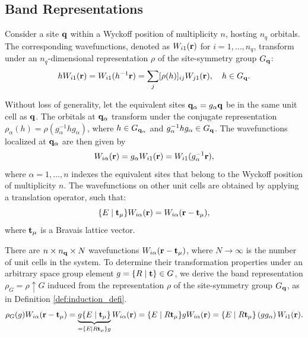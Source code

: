 \documentclass[12pt]{report}
\begin{document}
\subsection{Band Representations} \label{subsec:band_reps}

Consider a site \({\vb{q}}\) within a Wyckoff position of multiplicity \(n\), hosting \(n_q\) orbitals. The corresponding wavefunctions, denoted as \(W_{i1}({\vb{r}})\) for \(i = 1, \ldots, n_q\), transform under an \(n_q\)-dimensional representation \(\rho\) of the site-symmetry group \(G_{\vb{q}}\):
\begin{equation} \label{eq:gWi1_nq_rep}
h W_{i1}({\vb{r}}) = W_{i1}(h^{-1} {\vb{r}}) = \sum_{j} [\rho(h)]_{ij} W_{j1}({\vb{r}}), \quad h \in G_{\vb{q}}.
\end{equation}

Without loss of generality, let the equivalent sites \({\vb{q}}_\alpha = g_{\alpha} {\vb{q}}\) be in the same unit cell as \({\vb{q}}\). The orbitals at \({\vb{q}}_\alpha\) transform under the conjugate representation \(\rho_\alpha(h) = \rho(g_\alpha^{-1} h g_\alpha)\), where \(h \in G_{{\vb{q}}_\alpha}\) and \(g_\alpha^{-1} h g_\alpha \in G_{\vb{q}}\). The wavefunctions localized at \({\vb{q}}_\alpha\) are then given by
\begin{equation} \label{eq:Wialpha_galpha_action}
W_{i\alpha}({\vb{r}}) = g_\alpha W_{i1}({\vb{r}}) = W_{i1}(g_\alpha^{-1} {\vb{r}}),
\end{equation}
where \(\alpha = 1, \ldots, n\) indexes the equivalent sites that belong to the Wyckoff position of multiplicity \(n\). The wavefunctions on other unit cells are obtained by applying a translation operator, such that:
\begin{equation} \label{eq:translated_Wialpha}
\{ E \mid {\vb{t}}_\mu \} W_{i\alpha}({\vb{r}}) = W_{i\alpha}({\vb{r}}-{\vb{t}}_\mu),
\end{equation}
where ${\vb{t}}_\mu$ is a Bravais lattice vector.

There are \(n \times n_{\vb{q}} \times N\) wavefunctions \(W_{i\alpha}({\vb{r}} - {\vb{t}}_\mu)\), where \(N \to \infty\) is the number of unit cells in the system. To determine their transformation properties under an arbitrary space group element \(g = \{ R \mid {\vb{t}} \} \in G\), we derive the band representation \(\rho_G = \rho \uparrow G\) induced from the representation \(\rho\) of the site-symmetry group \(G_{\vb{q}}\), as in Definition \ref{def:induction_defi}.
\begin{equation} \label{eq:induced_rho_G_wannier_step1}
\rho_G(g) W_{i\alpha}({\vb{r}}-{\vb{t}}_\mu) =
\underbrace{g \{ E \mid {\vb{t}}_\mu \}}_{= \{ E \mid R{\vb{t}}_\mu \} g} W_{i\alpha} ({\vb{r}}) =
\{ E \mid R{\vb{t}}_\mu \} g W_{i\alpha} ({\vb{r}}) =
\{ E \mid R{\vb{t}}_\mu \} \, (g g_\alpha) \, W_{i1} ({\vb{r}}).
\end{equation}
\end{document}
